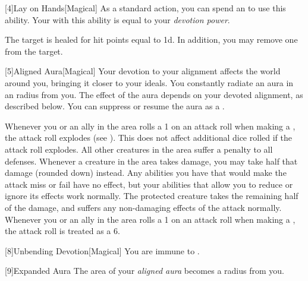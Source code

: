         [4]{Lay on Hands}[Magical] As a standard action, you can spend an  to use this ability.
        Your  with this ability is equal to your \textit{devotion power}.
        \begin{ability}
            \begin{spelltargetinginfo}
            \end{spelltargetinginfo}
            \begin{spelleffects}
                \spelleffect The target is healed for hit points equal to  \plus1d.
                In addition, you may remove one  from the target.
            \end{spelleffects}
        \end{ability}

        [5]{Aligned Aura}[Magical]
        Your devotion to your alignment affects the world around you, bringing it closer to your ideals.
        You constantly radiate an aura in an \areamed radius  from you.
        The effect of the aura depends on your devoted alignment, as described below.
        You can suppress or resume the aura as a .

         Whenever you or an ally in the area rolls a 1 on an attack roll when making a , the attack roll explodes (see ).
        This does not affect additional dice rolled if the attack roll explodes.
         All other creatures in the area suffer a  penalty to all defenses.
         Whenever a creature in the area takes damage, you may take half that damage (rounded down) instead.
        Any abilities you have that would make the attack miss or fail have no effect, but your abilities that allow you to reduce or ignore its effects work normally.
        The protected creature takes the remaining half of the damage, and suffers any non-damaging effects of the attack normally.
         Whenever you or an ally in the area rolls a 1 on an attack roll when making a , the attack roll is treated as a 6.

        [8]{Unbending Devotion}[Magical]
        You are immune to  .

        [9]{Expanded Aura}
        The area of your \textit{aligned aura} becomes a \arealarge radius  from you.

